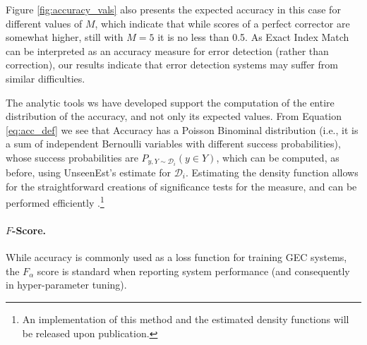 \documentclass[letter,11pt]{article}
\newcommand{\lc}[1]{\footnote{\color{blue}LC: #1}}
\begin{document}
Figure \ref{fig:accuracy_vals} also presents the expected accuracy in this case
for different values of $M$, which indicate that while scores of a perfect corrector are somewhat higher,
still with $M=5$ it is no less than 0.5.
As Exact Index Match can be interpreted as an accuracy measure for error detection (rather than correction),
our results indicate that error detection systems may suffer from similar difficulties.
%

The analytic tools ws have developed support the computation of the entire distribution of the accuracy,
and not only its expected values. From Equation \ref{eq:acc_def} we see that Accuracy has a Poisson Binominal distribution (i.e., it is a sum of independent Bernoulli variables with different success probabilities), whose success probabilities are $P_{y,Y \sim \mathcal{D}_i}(y \in Y)$, which can be computed, as before, using {\sc UnseenEst}'s estimate for $\mathcal{D}_i$. Estimating the density function allows for the straightforward creations of significance tests for the measure, and can be performed efficiently \cite{hong2013computing}.\footnote{An implementation of this method and the estimated density functions will be released upon publication.}

\paragraph{$F$-Score.}
While accuracy is commonly used as a loss function for training GEC systems,
the $F_\alpha$ score is standard when reporting system performance (and consequently in hyper-parameter
tuning).
\end{document}
